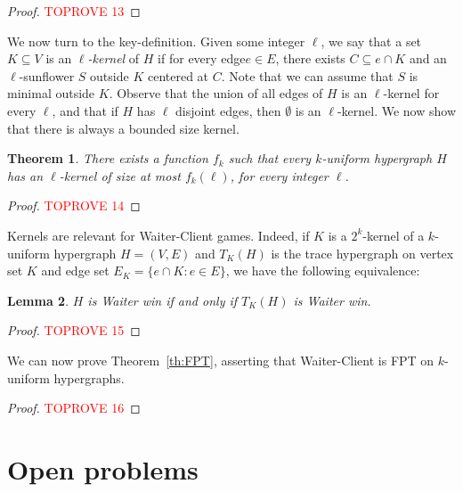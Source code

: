 \documentclass{article}
\newcommand{\hedge}{edge\xspace}
\newcommand{\hedges}{edges\xspace}
\newtheorem{theorem}{Theorem}
\newtheorem{lemma}[theorem]{Lemma}
\begin{document}
\begin{proof}\textcolor{red}{TOPROVE 13}\end{proof}





We now turn to the key-definition. Given some integer $\ell$, we say that a set $K\subseteq V$ is an \emph{$\ell$-kernel} of $H$ if for every \hedge $e\in E$, there exists $C\subseteq e\cap K$ and an $\ell$-sunflower $S$ outside $K$ centered at $C$. Note that we can assume that $S$ is minimal outside $K$. 
Observe that the union of all \hedges of $H$ is an $\ell$-kernel for every $\ell$, and that if $H$ has $\ell$ disjoint \hedges, then $\emptyset$ is an $\ell$-kernel. We now show that there is always a bounded size kernel.

\begin{theorem}\label{th:kernel}
There exists a function $f_k$ such that every $k$-uniform hypergraph $H$ has an $\ell$-kernel of size at most $f_k(\ell)$, for every integer $\ell$.
\end{theorem}


\begin{proof}\textcolor{red}{TOPROVE 14}\end{proof}

Kernels are relevant for Waiter-Client games. Indeed, if $K$ is a $2^k$-kernel of a $k$-uniform hypergraph $H=(V,E)$ and $T_K(H)$ is the trace hypergraph on vertex set $K$ and \hedge set $E_K=\{e\cap K:e\in E\}$, we have the following equivalence:

\begin{lemma}\label{lem:equiv}
$H$ is Waiter win if and only if $T_K(H)$ is Waiter win. 
\end{lemma}

\begin{proof}\textcolor{red}{TOPROVE 15}\end{proof}

We can now prove Theorem~\ref{th:FPT}, asserting that Waiter-Client is FPT on $k$-uniform hypergraphs. 

\begin{proof}\textcolor{red}{TOPROVE 16}\end{proof}



\section{Open problems} \label{sec: open}
\end{document}
